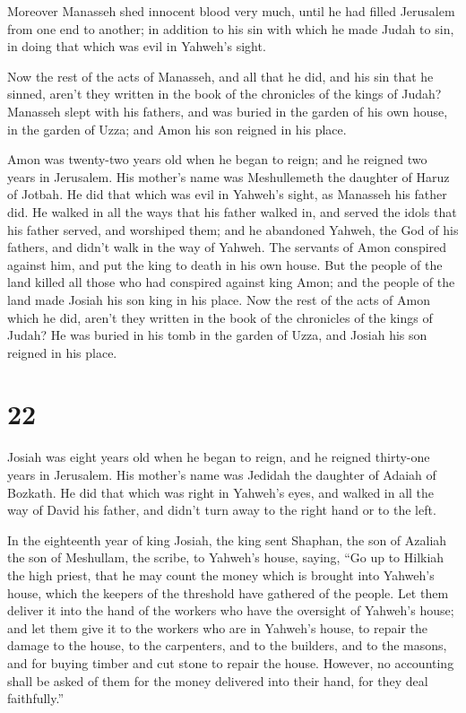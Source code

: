  Moreover Manasseh shed innocent blood very much, until
he had filled Jerusalem from one end to another; in addition to his sin
with which he made Judah to sin, in doing that which was evil in
Yahweh's sight.

 Now the rest of the acts of Manasseh, and all that he
did, and his sin that he sinned, aren't they written in the book of the
chronicles of the kings of Judah?  Manasseh slept with
his fathers, and was buried in the garden of his own house, in the
garden of Uzza; and Amon his son reigned in his place.

 Amon was twenty-two years old when he began to reign;
and he reigned two years in Jerusalem. His mother's name was
Meshullemeth the daughter of Haruz of Jotbah.  He did
that which was evil in Yahweh's sight, as Manasseh his father did.
 He walked in all the ways that his father walked in, and
served the idols that his father served, and worshiped them;
 and he abandoned Yahweh, the God of his fathers, and
didn't walk in the way of Yahweh.  The servants of Amon
conspired against him, and put the king to death in his own house.
 But the people of the land killed all those who had
conspired against king Amon; and the people of the land made Josiah his
son king in his place.  Now the rest of the acts of Amon
which he did, aren't they written in the book of the chronicles of the
kings of Judah?  He was buried in his tomb in the garden
of Uzza, and Josiah his son reigned in his place.

\hypertarget{section-21}{%
\section{22}\label{section-21}}

 Josiah was eight years old when he began to reign, and he
reigned thirty-one years in Jerusalem. His mother's name was Jedidah the
daughter of Adaiah of Bozkath.  He did that which was
right in Yahweh's eyes, and walked in all the way of David his father,
and didn't turn away to the right hand or to the left.

 In the eighteenth year of king Josiah, the king sent
Shaphan, the son of Azaliah the son of Meshullam, the scribe, to
Yahweh's house, saying,  ``Go up to Hilkiah the high
priest, that he may count the money which is brought into Yahweh's
house, which the keepers of the threshold have gathered of the people.
 Let them deliver it into the hand of the workers who have
the oversight of Yahweh's house; and let them give it to the workers who
are in Yahweh's house, to repair the damage to the house, 
to the carpenters, and to the builders, and to the masons, and for
buying timber and cut stone to repair the house.  However,
no accounting shall be asked of them for the money delivered into their
hand, for they deal faithfully.''


